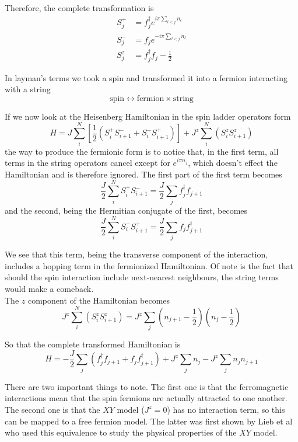 \documentclass[../intro.tex,../../main.tex]{subfiles}
\begin{document}
Therefore, the complete transformation is
\begin{equation}
    \begin{split}
        S^{+}_{j} &= f_{j}^{\dagger}e^{i\pi\sum_{l<j}n_{l}}\\
        S^{-}_{j} &= f_{j}e^{-i\pi\sum_{l<j}n_{l}}\\
        S^{z}_{j} &= f_{j}^{\dagger}f_{j}-\frac{1}{2}
    \end{split}
\end{equation}

In layman's terms we took a spin and transformed it into a fermion interacting with a string
\begin{equation*}
    \text{spin}\leftrightarrow\text{fermion}\times\text{string}
\end{equation*}

If we now look at the Heisenberg Hamiltonian in the spin ladder operators form
\begin{equation}
H=J\sum_{i}^{N}\left[\frac{1}{2}(S_{i}^{+}S_{i+1}^{-}+S_{i}^{-}S_{i+1}^{+})\right]+J^{z}\sum_{i}^{N}(S_{i}^{z}S_{i+1}^{z})
\end{equation}
the way to produce the fermionic form is to notice that, in the first term, all terms in the string operators cancel except for $e^{i\pi n_{j}}$, which doesn't effect the Hamiltonian and is therefore ignored. The first part of the first term becomes
\begin{equation}
    \frac{J}{2}\sum_{i}^{N}S_{i}^{+}S_{i+1}^{-}=\frac{J}{2}\sum_{j}f_{j}^{\dagger}f_{j+1}
\end{equation}
and the second, being the Hermitian conjugate of the first, becomes
\begin{equation}
    \frac{J}{2}\sum_{i}^{N}S_{i}^{-}S_{i+1}^{+}=\frac{J}{2}\sum_{j}f_{j}f_{j+1}^{\dagger}
\end{equation}

We see that this term, being the transverse component of the interaction, includes a hopping term in the fermionized Hamiltonian. Of note is the fact that should the spin interaction include next-nearest neighbours, the string terms would make a comeback.\\

The $z$ component of the Hamiltonian becomes
\begin{equation}
    J^{z}\sum_{i}^{N}(S_{i}^{z}S_{i+1}^{z})=J^{z}\sum_{j}\left(n_{j+1}-\frac{1}{2}\right)\left(n_{j}-\frac{1}{2}\right)
\end{equation}

So that the complete transformed Hamiltonian is
\begin{equation}
    H=-\frac{J}{2}\sum_{j}(f_{j}^{\dagger}f_{j+1}+f_{j}f_{j+1}^{\dagger})+J^{z}\sum_{j}n_{j}-J^{z}\sum_{j}n_{j}n_{j+1}
\end{equation}

There are two important things to note. The first one is that the ferromagnetic interactions mean that the spin fermions are actually attracted to one another. The second one is that the $XY$ model ($J^{z}=0$) has no interaction term, so this can be mapped to a free fermion model. The latter was first shown by Lieb et al\cite{lieb} who used this equivalence to study the physical properties of the $XY$ model.
\end{document}
